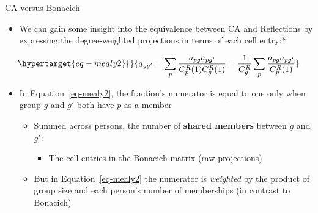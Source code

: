\documentclass[
  ignorenonframetext,
]{beamer}
\providecommand{\tightlist}{%
  \setlength{\itemsep}{0pt}\setlength{\parskip}{0pt}}\usepackage{longtable,booktabs,array}
\begin{document}
\begin{frame}{CA versus Bonacich}
\protect\hypertarget{ca-versus-bonacich-4}{}
\begin{itemize}
\tightlist
\item
  We can gain some insight into the equivalence between CA and
  Reflections by expressing the degree-weighted projections in terms of
  each cell entry:*
\end{itemize}

\begin{equation}\protect\hypertarget{eq-mealy2}{}{
    a_{gg'} = \sum_p\frac{a_{pg}a_{pg'}}{C^R_p(1)C^R_g(1)} = 
    \frac{1}{C^R_g}\sum_p\frac{a_{pg}a_{pg'}}{C^R_p(1)}
}\label{eq-mealy2}\end{equation}

\begin{itemize}
\item
  In Equation~\ref{eq-mealy2}, the fraction's numerator is equal to one
  only when group \(g\) and \(g'\) both have \(p\) as a member

  \begin{itemize}
  \tightlist
  \item
    Summed across persons, the number of \textbf{shared members} between
    \(g\) and \(g'\):

    \begin{itemize}
    \tightlist
    \item
      The cell entries in the Bonacich matrix (raw projections)
    \end{itemize}
  \item
    But in Equation~\ref{eq-mealy2} the numerator is \emph{weighted} by
    the product of group size and each person's number of memberships
    (in contrast to Bonacich)
  \end{itemize}
\end{itemize}

\end{frame}
\end{document}
